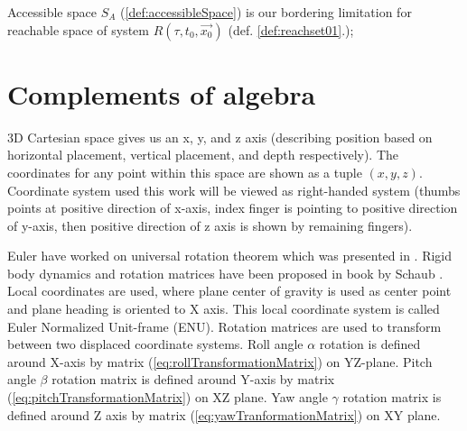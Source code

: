  \noindent Accessible space $S_A$ (\ref{def:accessibleSpace}) is our bordering limitation for reachable space of system $R(\tau,t_0,\vec{x_0})$ (def. \ref{def:reachset01}.); 

 
\section{Complements of algebra}

\noindent 3D Cartesian space gives us an x, y, and z axis (describing position based on horizontal placement, vertical placement, and depth respectively). The coordinates for any point within this space are shown as a tuple $(x,y,z)$. Coordinate system used this work will be viewed as right-handed system (thumbs points at positive direction of x-axis, index finger is pointing to positive direction of y-axis, then positive  direction of z axis is shown by remaining fingers).

Euler have worked on universal rotation theorem which was presented in \cite{euler1775formulae}. Rigid body dynamics and rotation matrices have been proposed in book by Schaub \cite{schaub2003analytical}. Local coordinates are used, where plane center of gravity is used as center point and plane heading is oriented to X axis. This local coordinate system is called Euler Normalized Unit-frame (ENU). Rotation matrices are used to transform between two displaced coordinate systems. Roll angle $\alpha$ rotation is defined around X-axis by matrix (\ref{eq:rollTransformationMatrix}) on YZ-plane. Pitch angle $\beta$ rotation matrix is defined around Y-axis by matrix (\ref{eq:pitchTransformationMatrix}) on XZ plane. Yaw angle $\gamma$ rotation matrix is defined around Z axis by matrix (\ref{eq:yawTranformationMatrix}) on XY plane.

